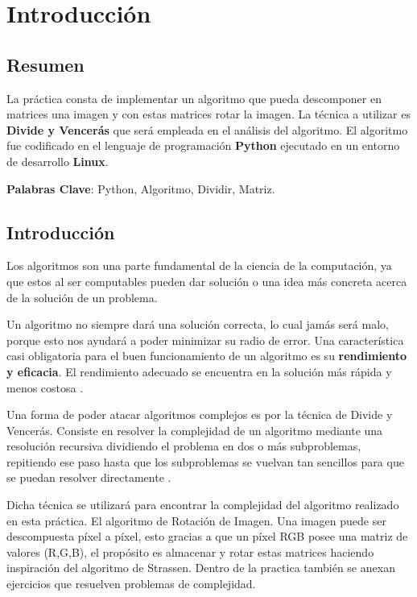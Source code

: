 
\chapter{Introducción}



\section{Resumen}
    La práctica consta de implementar un algoritmo que pueda descomponer en matrices una imagen y con estas matrices rotar la imagen. La técnica a utilizar es \textbf{Divide y Vencerás} que será empleada en el análisis del algoritmo. El algoritmo fue codificado en el lenguaje de programación \textbf{Python} ejecutado en un entorno de desarrollo \textbf{Linux}.
    
    \textbf{Palabras Clave}: Python, Algoritmo, Dividir, Matriz.

\section{Introducción}

    Los algoritmos son una parte fundamental de la ciencia de la computación, ya que estos al ser computables pueden dar solución o una idea más concreta acerca de la solución de un problema.
    
    Un algoritmo no siempre dará una solución correcta, lo cual jamás será malo, porque esto nos ayudará a poder minimizar su radio de error. Una característica casi obligatoria para el buen funcionamiento de un algoritmo es su \textbf{rendimiento y eficacia}. El rendimiento adecuado se encuentra en la solución más rápida y menos costosa \cite{Algorithm}.

    Una forma de poder atacar algoritmos complejos es por la técnica de Divide y Vencerás. Consiste en resolver la complejidad de un algoritmo mediante una resolución recursiva dividiendo el problema en dos o más subproblemas, repitiendo ese paso hasta que los subproblemas se vuelvan tan sencillos para que se puedan resolver directamente \cite{DivideYVencerass}.

    Dicha técnica se utilizará para encontrar la complejidad del algoritmo realizado en esta práctica. El algoritmo de Rotación de Imagen. Una imagen puede ser descompuesta píxel a píxel, esto gracias a que un píxel RGB posee una matriz de valores (R,G,B), el propósito es almacenar y rotar estas matrices haciendo inspiración del algoritmo de Strassen. 
    Dentro de la practica también se anexan ejercicios que resuelven problemas de complejidad.



    
